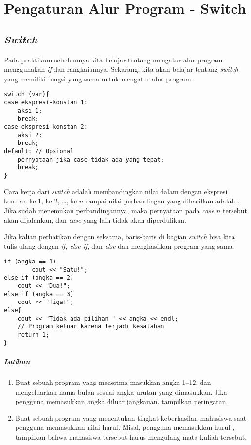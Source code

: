 \documentclass[../main.tex]{subfiles}
\begin{document}
\chapter{Pengaturan Alur Program - Switch}
\section{\emph{Switch}}
Pada praktikum sebelumnya kita belajar tentang mengatur alur program menggunakan
\emph{if} dan rangkaiannya. Sekarang, kita akan belajar tentang \emph{switch}
yang memiliki fungsi yang sama untuk mengatur alur program.

\begin{verbatim}
switch (var){
case ekspresi-konstan 1:
    aksi 1;
    break;
case ekspresi-konstan 2:
    aksi 2:
    break;
default: // Opsional
    pernyataan jika case tidak ada yang tepat;
    break;
}
\end{verbatim}

Cara kerja dari \emph{switch} adalah membandingkan nilai dalam  dengan
ekspresi konstan ke-1, ke-2, \ldots{}, ke-\(n\) sampai nilai perbandingan yang
dihasilkan adalah . Jika sudah menemukan perbandingannya, maka
pernyataan pada \emph{case} \(n\) tersebut akan dijalankan, dan \emph{case} yang
lain tidak akan diperdulikan.


Jika kalian perhatikan dengan seksama, baris-baris di bagian \emph{switch} bisa
kita tulis ulang dengan \emph{if, else if,} dan \emph{else} dan menghasilkan
program yang sama.

\begin{verbatim}
if (angka == 1)
        cout << "Satu!";
else if (angka == 2)
    cout << "Dua!";
else if (angka == 3)
    cout << "Tiga!";
else{
    cout << "Tidak ada pilihan " << angka << endl;
    // Program keluar karena terjadi kesalahan
    return 1;
}
\end{verbatim}

\paragraph{Latihan}
\begin{enumerate}
  \item Buat sebuah program yang menerima masukkan angka 1--12, dan mengeluarkan
  nama bulan sesuai angka urutan yang dimasukkan. Jika pengguna memasukkan angka
  diluar jangkauan, tampilkan peringatan.
  \item Buat sebuah program yang menentukan tingkat keberhasilan mahasiswa saat
  pengguna memasukkan nilai huruf. Misal, pengguna memasukkan huruf ,
  tampilkan bahwa mahasiswa tersebut harus mengulang mata kuliah tersebut.
\end{enumerate}
\end{document}
